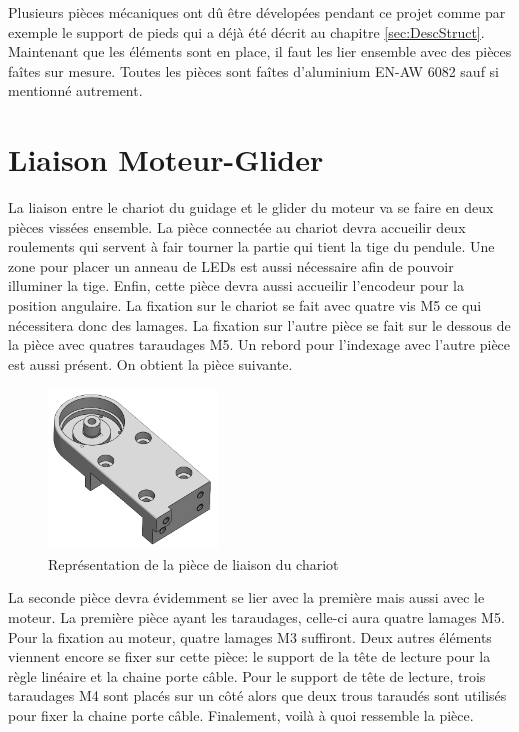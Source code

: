 Plusieurs pièces mécaniques ont dû être dévelopées pendant ce projet comme par exemple le support de pieds  qui a déjà été décrit au chapitre \ref{sec:DescStruct}.
Maintenant que les éléments sont en place, il faut les lier ensemble avec des pièces faîtes sur mesure. Toutes les pièces sont faîtes
d'aluminium EN-AW 6082 sauf si mentionné autrement.

\section{Liaison Moteur-Glider}\label{sec:LiaisonMotGlid}
La liaison entre le chariot du guidage et le \gls{glider} du moteur va se faire en deux pièces vissées ensemble. La pièce
connectée au chariot devra accueilir deux roulements qui servent à fair tourner la partie qui tient la tige du pendule. Une zone pour placer
un anneau de LEDs est aussi nécessaire afin de pouvoir illuminer la tige. Enfin, cette pièce devra aussi accueilir l'encodeur pour la position
angulaire. La fixation sur le chariot se fait avec quatre vis M5 ce qui nécessitera donc des lamages. La fixation sur l'autre pièce se fait sur
le dessous de la pièce avec quatres taraudages M5. Un rebord pour l'indexage avec l'autre pièce est aussi présent. On obtient la pièce suivante.

\begin{figure}[H]
    \centering
    \includegraphics[width = 0.4\textwidth]{assets/figures/LiaisonChariot.png}
    \caption{Représentation de la pièce de liaison du chariot}
    \label{fig:LiaisonChariot}
\end{figure}

La seconde pièce devra évidemment se lier avec la première mais aussi avec le moteur. La première pièce ayant les taraudages, celle-ci aura quatre
lamages M5. Pour la fixation au moteur, quatre lamages M3 suffiront. Deux autres éléments viennent encore se fixer sur cette pièce: le support de
la tête de lecture pour la règle linéaire et la chaine porte câble. Pour le support de tête de lecture, trois taraudages M4 sont placés sur un côté
alors que deux trous taraudés sont utilisés pour fixer la chaine porte câble. Finalement, voilà à quoi ressemble la pièce.


